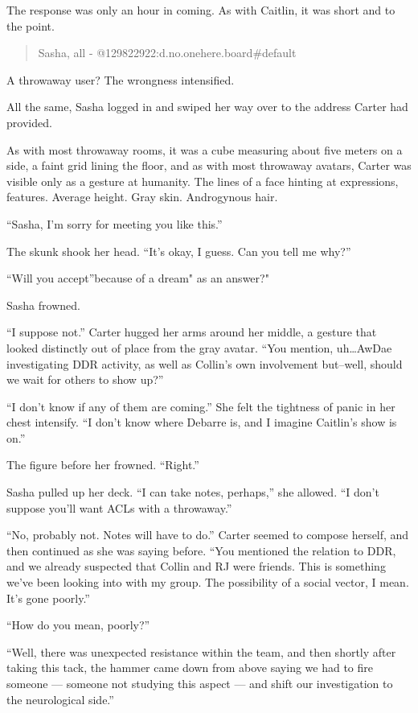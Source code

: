 The response was only an hour in coming. As with Caitlin, it was short and to the point.

\begin{quote}
Sasha, all - @129822922:d.no.onehere.board\#default
\end{quote}

A throwaway user? The wrongness intensified.

All the same, Sasha logged in and swiped her way over to the address Carter had provided.

As with most throwaway rooms, it was a cube measuring about five meters on a side, a faint grid lining the floor, and as with most throwaway avatars, Carter was visible only as a gesture at humanity. The lines of a face hinting at expressions, features. Average height. Gray skin. Androgynous hair.

``Sasha, I'm sorry for meeting you like this.''

The skunk shook her head. ``It's okay, I guess. Can you tell me why?''

``Will you accept''because of a dream" as an answer?"

Sasha frowned.

``I suppose not.'' Carter hugged her arms around her middle, a gesture that looked distinctly out of place from the gray avatar. ``You mention, uh\ldots{}AwDae investigating DDR activity, as well as Collin's own involvement but--well, should we wait for others to show up?''

``I don't know if any of them are coming.'' She felt the tightness of panic in her chest intensify. ``I don't know where Debarre is, and I imagine Caitlin's show is on.''

The figure before her frowned. ``Right.''

Sasha pulled up her deck. ``I can take notes, perhaps,'' she allowed. ``I don't suppose you'll want ACLs with a throwaway.''

``No, probably not. Notes will have to do.'' Carter seemed to compose herself, and then continued as she was saying before. ``You mentioned the relation to DDR, and we already suspected that Collin and RJ were friends. This is something we've been looking into with my group. The possibility of a social vector, I mean. It's gone poorly.''

``How do you mean, poorly?''

``Well, there was unexpected resistance within the team, and then shortly after taking this tack, the hammer came down from above saying we had to fire someone — someone not studying this aspect — and shift our investigation to the neurological side.''

